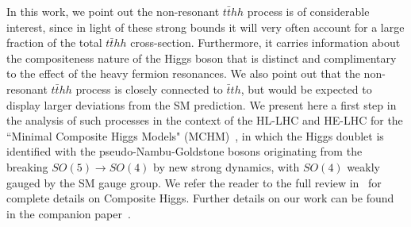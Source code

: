 In this work, we point out the non-resonant ${t\bar t}hh$ process is of considerable interest, since in light of these strong bounds it will very often account for a large fraction of the total ${t\bar t}hh$ cross-section. Furthermore, it carries
information about the compositeness nature of the Higgs boson that is distinct and complimentary to the effect of the heavy fermion resonances. We also point out that the non-resonant
${t\bar t}hh$ process is closely connected to ${\bar t}th$, but would be expected to display larger deviations from the
SM prediction.  We present here a first step in the analysis of such
processes in the context of the HL-LHC and HE-LHC for the ``Minimal Composite Higgs
Models" (MCHM)~\cite{Agashe:2004rs}, in which the Higgs doublet is identified with the pseudo-Nambu-Goldstone bosons originating from the breaking $SO(5) \to SO(4)$ by new strong dynamics, with $SO(4)$ weakly gauged by the SM gauge group. We refer the
reader to the full review in~\cite{Panico:2015jxa} for complete
details on Composite Higgs.  Further details on our work
 can be found in the companion paper~\cite{MCHMtthh}.



